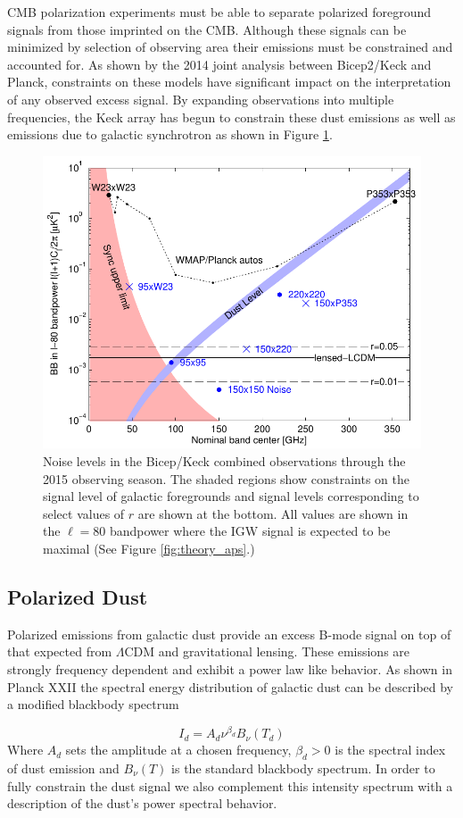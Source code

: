 \documentclass[12pt]{article}
\begin{document}
CMB polarization experiments must be able to separate polarized foreground
signals from those imprinted on the CMB. Although these signals can be
minimized by selection of observing area their emissions must be constrained
and accounted for. As shown by the 2014 joint analysis between Bicep2/Keck and
Planck, constraints on these models have significant impact on the
interpretation of any observed excess signal. By expanding observations into
multiple frequencies, the Keck array has begun to constrain these dust
emissions as well as emissions due to galactic synchrotron as shown in Figure
\ref{fig:noilev}.
\begin{figure}
	\center
	\includegraphics[width=.7\textwidth]{noilev_bk15.pdf}
	\caption{Noise levels in the Bicep/Keck combined observations through the
	2015 observing season. The shaded regions show constraints on the signal
	level of galactic foregrounds and signal levels corresponding to select values
	of $r$ are shown at the bottom. All values are shown in the $\ell=80$
	bandpower where the IGW signal is expected to be maximal (See Figure
	\ref{fig:theory_aps}.)}
	\label{fig:noilev}
\end{figure}

\subsection{Polarized Dust}
Polarized emissions from galactic dust provide an excess B-mode signal on top of
that expected from $\Lambda$CDM and gravitational lensing. These emissions 
are strongly frequency dependent and exhibit a power law like behavior. As shown
in Planck XXII \cite{cite:PlanckXXII} the spectral energy distribution of
galactic dust can be described by a modified blackbody spectrum

\begin{equation}
	I_d=A_d\nu ^{\beta_d} B_{\nu}(T_d)
	\label{eq:dust_sed}
\end{equation}
Where $A_d$ sets the amplitude at a chosen frequency, $\beta _d > 0$ is the spectral
index of dust emission and $B_{\nu}(T)$ is the standard blackbody spectrum. In order
to fully constrain the dust signal we also complement this intensity
spectrum with a description of the dust's power spectral behavior.
\end{document}
